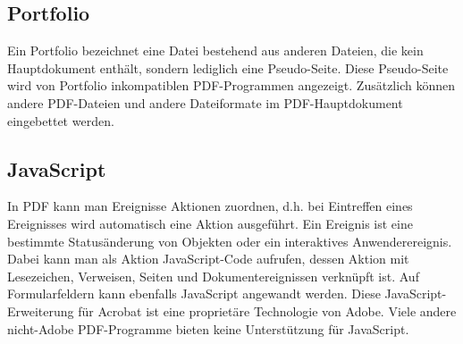 \subsection{Portfolio}
Ein Portfolio bezeichnet eine Datei bestehend aus anderen Dateien, die kein Hauptdokument enthält, sondern lediglich eine Pseudo-Seite. Diese Pseudo-Seite wird von Portfolio inkompatiblen PDF-Programmen angezeigt. Zusätzlich können andere PDF-Dateien und andere Dateiformate im PDF-Hauptdokument eingebettet werden. \cite{softx}

\subsection{JavaScript}
In PDF kann man Ereignisse Aktionen zuordnen, d.h. bei Eintreffen eines Ereignisses wird automatisch eine Aktion ausgeführt. Ein Ereignis ist eine bestimmte Statusänderung von Objekten oder ein interaktives Anwenderereignis. Dabei kann man als Aktion JavaScript-Code aufrufen, dessen Aktion mit Lesezeichen, Verweisen, Seiten und Dokumentereignissen verknüpft ist. Auf Formularfeldern kann ebenfalls JavaScript angewandt werden. \cite{softx} Diese JavaScript-Erweiterung für Acrobat ist eine proprietäre Technologie von Adobe. Viele andere nicht-Adobe PDF-Programme bieten keine Unterstützung für JavaScript. \cite{wiki-pdf-engl}